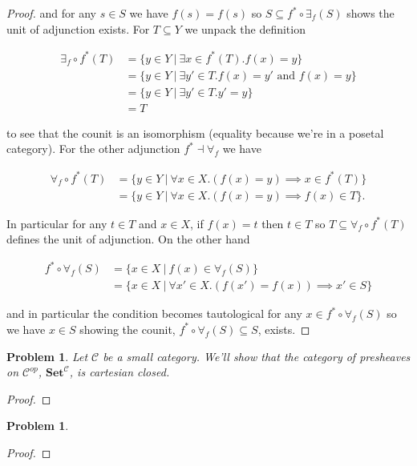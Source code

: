 \documentclass[11pt]{amsart}
\theoremstyle{plain}
\newtheorem{prob}[thm]{Problem}
\theoremstyle{definition}
\newcommand{\cC}{{\mathcal C}}
\newcommand{\Set}{{\mathbf{Set}}}
\newcommand{\noi}{{\noindent}}
\begin{document}
\begin{proof}
\noi and for any $s \in S$ we have $f(s) = f(s)$ so $S \subseteq f^* \circ \exists_f(S)$ shows the unit of adjunction exists. For $T \subseteq Y$ we unpack the definition

\begin{align*}
\exists_f \circ f^* (T) 
&= \{ y \in Y \ | \ \exists x \in f^*(T) . f(x) = y \} \\
&= \{ y \in Y \ | \ \exists y' \in T . f(x) = y' \text{ and } f(x) = y \}  \\
&= \{ y \in Y \ | \ \exists y' \in T . y' = y \} \\
&= T  
\end{align*}

\noi to see that the counit is an isomorphism (equality because we're in a posetal category). For the other adjunction $f^* \dashv \forall_f$ we have 

\begin{align*}
\forall_f \circ f^* (T) 
&= \{ y \in Y \ | \ \forall x \in X. (f(x) = y) \implies x \in f^*(T) \}\\
&= \{ y \in Y \ | \ \forall x \in X. (f(x) = y) \implies f(x) \in T \}.
\end{align*}


\noi In particular for any $t \in T$ and $x \in X$, if $f(x) = t$ then $t \in T$ so $T \subseteq \forall_f \circ f^* (T) 
$ defines the unit of adjunction. On the other hand 

\begin{align*}
f^* \circ \forall_f(S)
&= \{ x \in X \ | \ f(x) \in \forall_f(S) \} \\
&= \{ x \in X \ | \ \forall x' \in X. (f(x') = f(x)) \implies x' \in S \}
\end{align*}

\noi and in particular the condition becomes tautological for any $x \in f^* \circ \forall_f(S)$ so we have $x \in S$ showing the counit, $f^* \circ \forall_f(S) \subseteq S$, exists. 
\end{proof}



\begin{prob}
Let $\cC$ be a small category. We'll show that the category of presheaves on $\cC^{op}$, $\Set^\cC$, is cartesian closed. 
\end{prob}
\begin{proof}
\end{proof}



\begin{prob}
\end{prob}
\begin{proof}
\end{proof}
\end{document}
